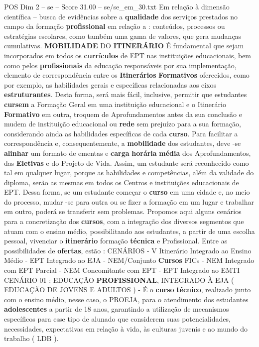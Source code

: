 \begin{textsample}{POS Dim 2 – se – Score 31.00 – se/se\_em\_30.txt}
Em relação à dimensão científica – busca de evidências sobre a \textbf{qualidade} dos serviços prestados no campo da formação \textbf{profissional} em relação a : conteúdos, processos ou estratégias escolares, como também uma gama de valores, que gera mudanças cumulativas. \textbf{MOBILIDADE} DO \textbf{ITINERÁRIO} É fundamental que sejam incorporados em todos os \textbf{currículos} de EPT nas instituições educacionais, bem como pelos \textbf{profissionais} da educação responsáveis por sua implementação, elemento de correspondência entre os \textbf{Itinerários} \textbf{Formativos} oferecidos, como por exemplo, as habilidades gerais e específicas relacionadas aos eixos \textbf{estruturantes}.
Desta forma, será mais fácil, inclusive, permitir que estudantes \textbf{cursem} a Formação Geral em uma instituição educacional e o Itinerário \textbf{Formativo} em outra, troquem de Aprofundamentos antes da sua conclusão e mudem de instituição educacional ou \textbf{rede} sem prejuízo para a sua formação, considerando ainda as habilidades específicas de cada \textbf{curso}.
Para facilitar a correspondência e, consequentemente, a \textbf{mobilidade} dos estudantes, deve -se \textbf{alinhar} um formato de ementas e \textbf{carga} \textbf{horária} \textbf{média} dos Aprofundamentos, das \textbf{Eletivas} e do Projeto de Vida.
Assim, um estudante será reconhecido como tal em qualquer lugar, porque as habilidades e competências, além da validade do diploma, serão as mesmas em todos os Centros e instituições educacionais de EPT.
Dessa forma, se um estudante começar o \textbf{curso} em uma cidade e, no meio do processo, mudar -se para outra ou se fizer a formação em um lugar e trabalhar em outro, poderá se transferir sem problemas.
Propomos aqui alguns cenários para a concretização dos \textbf{cursos}, com a integração dos diversos segmentos que atuam com o ensino médio, possibilitando aos estudantes, a partir de uma escolha pessoal, vivenciar o \textbf{itinerário} formação \textbf{técnica} e Profissional.
Entre as possibilidades de \textbf{ofertas}, estão : CENÁRIOS - V Itinerário Integrado ao Ensino Médio - EPT Integrado ao EJA - NEM/Conjunto \textbf{Cursos} FICs - NEM Integrado com EPT Parcial - NEM Concomitante com EPT - EPT Integrado ao EMTI CENÁRIO 01 : EDUCAÇÃO \textbf{PROFISSIONAL}, INTEGRADO À EJA ( EDUCAÇÃO DE JOVENS E ADULTOS ) - É o \textbf{curso} \textbf{técnico}, realizado junto com o ensino médio, nesse caso, o PROEJA, para o atendimento dos estudantes \textbf{adolescentes} a partir de 18 anos, garantindo a utilização de mecanismos específicos para esse tipo de alunado que considerem suas potencialidades, necessidades, expectativas em relação à vida, às culturas juvenis e ao mundo do trabalho ( LDB ).

\end{textsample}
